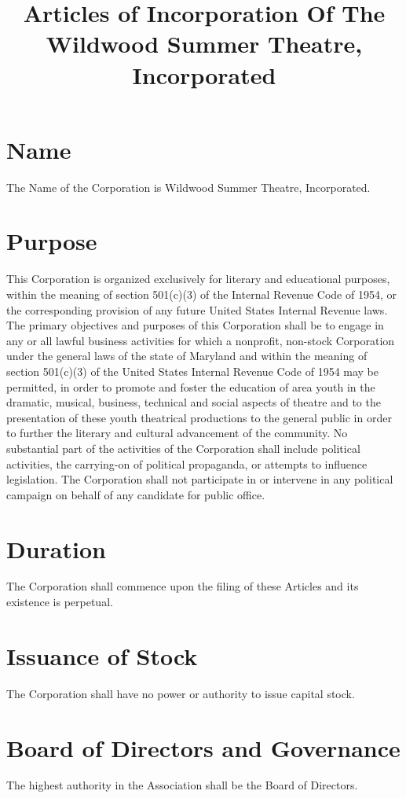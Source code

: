 \documentclass{wst}
\title{Articles of Incorporation Of The Wildwood Summer Theatre, Incorporated}
\begin{document}
\maketitle
\section{Name}
The Name of the Corporation is Wildwood Summer Theatre, Incorporated.

\section{Purpose}
This Corporation is organized exclusively for literary and educational
purposes, within the meaning of section 501(c)(3) of the Internal Revenue
Code of 1954, or the corresponding provision of any future United States
Internal Revenue laws. The primary objectives and purposes of this Corporation
shall be to engage in any or all lawful business activities for which a
nonprofit, non-stock Corporation under the general laws of the state of Maryland
and within the meaning of section 501(c)(3) of the United States Internal
Revenue Code of 1954 may be permitted, in order to promote and foster the
education of area youth in the dramatic, musical, business, technical and social
aspects of theatre and to the presentation of these youth theatrical productions
to the general public in order to further the literary and cultural advancement
of the community.  No substantial part of the activities of the Corporation
shall include political activities, the carrying-on of political propaganda, or
attempts to influence legislation.  The Corporation shall not participate in or
intervene in any political campaign on behalf of any candidate for public
office.

\section{Duration}
The Corporation shall commence upon the filing of these Articles and its
existence is perpetual.

\section{Issuance of Stock}
The Corporation shall have no power or authority to issue capital stock.

\section{Board of Directors and Governance}
The highest authority in the Association shall be the Board of Directors.
\end{document}

